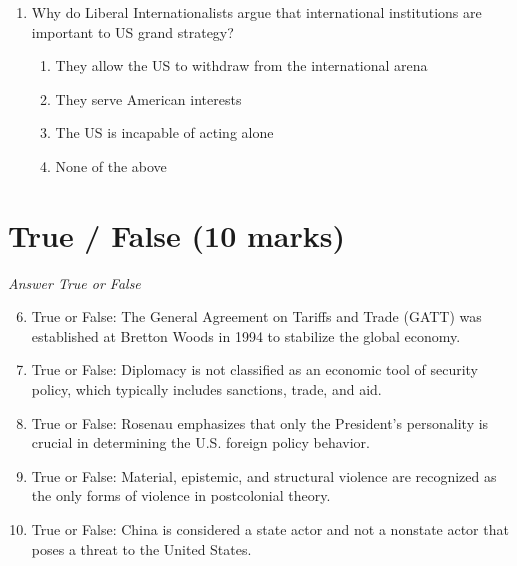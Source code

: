 \documentclass[12pt]{article}
\begin{document}
\begin{enumerate}[label=\arabic*.]
\begin{enumerate}[label=(\alph*)]
    \item on nuclear weapons signed between the United States and the Soviet Union.
    \item cutting conventional arms in Europe.
    \item to be rejected by the U.S. Senate.
    \item mandating the elimination of many long-range nuclear missiles.
\end{enumerate}
\item Why do Liberal Internationalists argue that international institutions are important to US grand strategy?
\begin{enumerate}[label=(\alph*)]
    \item They allow the US to withdraw from the international arena
    \item They serve American interests
    \item The US is incapable of acting alone
    \item None of the above
\end{enumerate}
\end{enumerate}

\section*{True / False (10 marks)}
\textit{Answer True or False}
\begin{enumerate}[label=\arabic*.]
\setcounter{enumi}{5}
\item True or False: The General Agreement on Tariffs and Trade (GATT) was established at Bretton Woods in 1994 to stabilize the global economy.
\item True or False: Diplomacy is not classified as an economic tool of security policy, which typically includes sanctions, trade, and aid.
\item True or False: Rosenau emphasizes that only the President's personality is crucial in determining the U.S. foreign policy behavior.
\item True or False: Material, epistemic, and structural violence are recognized as the only forms of violence in postcolonial theory.
\item True or False: China is considered a state actor and not a nonstate actor that poses a threat to the United States.
\end{enumerate}
\end{document}
